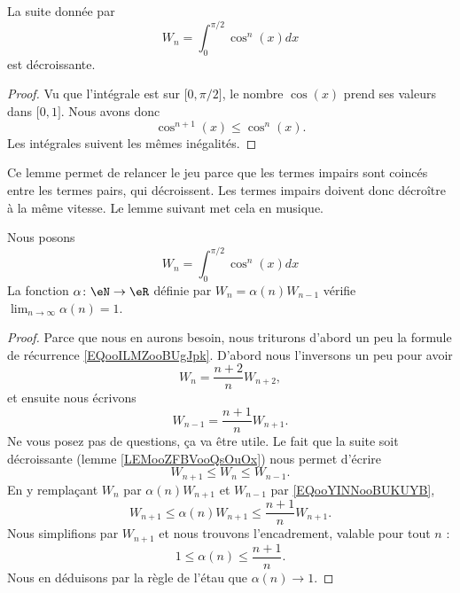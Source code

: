 \begin{lemma}       \label{LEMooZFBVooQsOuOx}
	La suite donnée par
	\begin{equation}
		W_n=\int_0^{\pi/2}\cos^n(x)dx
	\end{equation}
	est décroissante.
\end{lemma}

\begin{proof}
	Vu que l'intégrale est sur \( \mathopen[ 0 , \pi/2 \mathclose]\), le nombre \( \cos(x)\) prend ses valeurs dans \( \mathopen[ 0 , 1 \mathclose]\). Nous avons donc
	\begin{equation}
		\cos^{n+1}(x)\leq \cos^n(x).
	\end{equation}
	Les intégrales suivent les mêmes inégalités.
\end{proof}

Ce lemme permet de relancer le jeu parce que les termes impairs sont coincés entre les termes pairs, qui décroissent. Les termes impairs doivent donc décroître à la même vitesse. Le lemme suivant met cela en musique.

\begin{lemma}       \label{LEMooAXTEooLBXQuM}
	Nous posons
	\begin{equation}
		W_n=\int_0^{\pi/2}\cos^n(x)dx
	\end{equation}
	La fonction \( \alpha\colon \eN\to \eR\) définie par \( W_n=\alpha(n)W_{n-1}\) vérifie \( \lim_{n\to \infty} \alpha(n)=1\).
\end{lemma}

\begin{proof}
	Parce que nous en aurons besoin, nous triturons d'abord un peu la formule de récurrence \eqref{EQooILMZooBUgJpk}. D'abord nous l'inversons un peu pour avoir
	\begin{equation}
		W_n=\frac{ n+2 }{ n }W_{n+2},
	\end{equation}
	et ensuite nous écrivons
	\begin{equation}        \label{EQooYINNooBUKUYB}
		W_{n-1}=\frac{ n+1 }{ n }W_{n+1}.
	\end{equation}
	Ne vous posez pas de questions, ça va être utile. Le fait que la suite soit décroissante (lemme \ref{LEMooZFBVooQsOuOx}) nous permet d'écrire
	\begin{equation}
		W_{n+1}\leq W_n\leq W_{n-1}.
	\end{equation}
	En y remplaçant \( W_n\) par \( \alpha(n)W_{n+1}\) et \( W_{n-1}\) par \eqref{EQooYINNooBUKUYB},
	\begin{equation}
		W_{n+1}\leq \alpha(n)W_{n+1}\leq \frac{ n+1 }{ n }W_{n+1}.
	\end{equation}
	Nous simplifions par \( W_{n+1}\) et nous trouvons l'encadrement, valable pour tout \( n\) :
	\begin{equation}
		1\leq \alpha(n)\leq \frac{ n+1 }{ n }.
	\end{equation}
	Nous en déduisons par la règle de l'étau que \( \alpha(n)\to 1\).
\end{proof}

